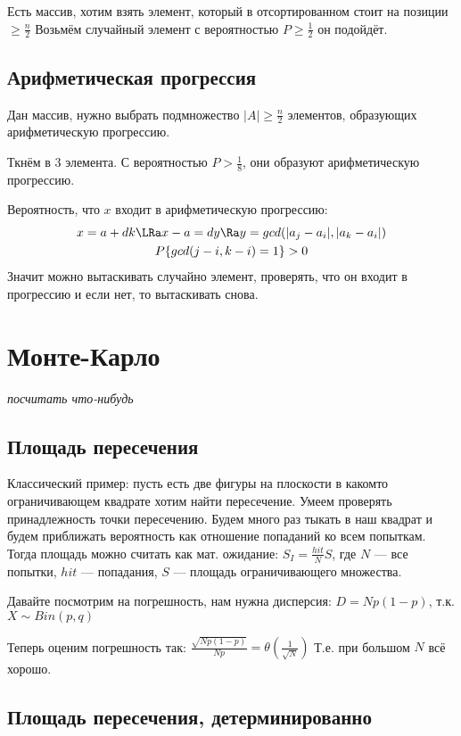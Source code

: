 Есть массив, хотим взять элемент, который в отсортированном стоит на позиции $\geq \frac{n}{2}$
Возьмём случайный элемент с вероятностью $P \geq \frac{1}{2}$ он подойдёт.

\subsection{Арифметическая прогрессия}
Дан массив, нужно выбрать подмножество $|A| \geq \frac{n}{2}$ элементов, образующих
арифметическую прогрессию.

Ткнём в 3 элемента. С вероятностью $P > \frac{1}{8}$, они образуют арифметическую прогрессию.

Вероятность, что $x$ входит в арифметическую прогрессию: 
\begin{gather*}
    x = a + dk \LRa x-a = dy \Ra y = gcd(|a_j - a_i|, |a_k - a_i|) \\
    P\{gcd(j-i, k-i) = 1\} > 0
\end{gather*}
Значит можно вытаскивать случайно элемент, проверять, что он входит в прогрессию и если
нет, то вытаскивать снова.

\section{Монте-Карло}

\textit{посчитать что-нибудь}

\subsection{Площадь пересечения}

Классический пример: пусть есть две фигуры на плоскости в какомто ограничивающем квадрате
хотим найти пересечение. Умеем проверять принадлежность точки пересечению.
Будем много раз тыкать в наш квадрат и будем приближать вероятность как отношение
попаданий ко всем попыткам. Тогда площадь можно считать как мат. ожидание:
$S_I = \frac{hit}{N} S$, где $N$ --- все попытки, $hit$ --- попадания, $S$ --- площадь 
ограничивающего множества.

Давайте посмотрим на погрешность, нам нужна дисперсия: $D = Np(1-p)$, т.к. $X\sim Bin(p, q)$

Теперь оценим погрешность так: $\frac{\sqrt{Np(1-p)}}{Np} = \theta(\frac{1}{\sqrt{N}})$
Т.е. при большом $N$ всё хорошо.

\subsection{Площадь пересечения, детерминированно}

